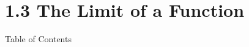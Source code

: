 
\section{1.3 The Limit of a Function}
\begin{frame}{ Table of Contents}
\mapofcontentsA{\ac}
 \end{frame}

